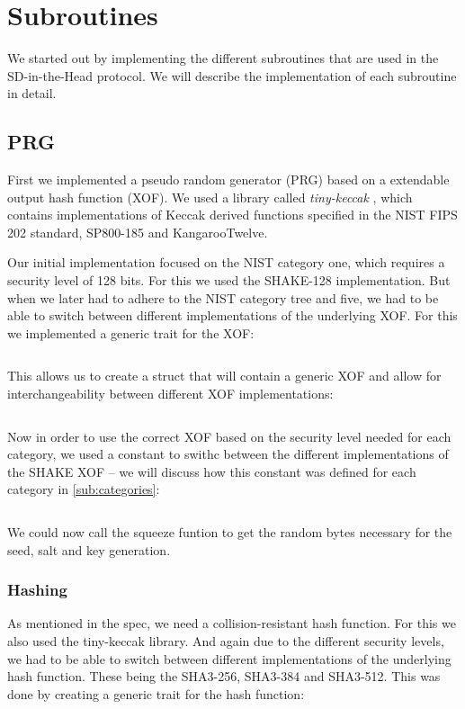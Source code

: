 \documentclass[twoside,11pt]{report}
\theoremstyle{definition}
\theoremstyle{plain}
\begin{document}
\section{Subroutines}\label{sub:subroutines}
We started out by implementing the different subroutines that are used in the SD-in-the-Head protocol. We will describe the implementation of each subroutine in detail.

\subsection{PRG}
First we implemented a pseudo random generator (PRG) based on a extendable output hash function (XOF). We used a library called \textit{tiny-keccak} \cite{tiny-keccak}, which contains implementations of Keccak derived functions specified in the NIST FIPS 202 standard, SP800-185 and KangarooTwelve.

Our initial implementation focused on the NIST category one, which requires a security level of 128 bits. For this we used the SHAKE-128 implementation. But when we later had to adhere to the NIST category tree and five, we had to be able to switch between different implementations of the underlying XOF. For this we implemented a generic trait for the XOF:
\inputminted[firstline=18, lastline=23]{rust}{../sdith/src/subroutines/prg/xof.rs}
This allows us to create a struct that will contain a generic XOF and allow for interchangeability between different XOF implementations:
\inputminted[firstline=25, lastline=27]{rust}{../sdith/src/subroutines/prg/xof.rs}
Now in order to use the correct XOF based on the security level needed for each category, we used a constant to swithc between the different implementations of the SHAKE XOF -- we will discuss how this constant was defined for each category in \autoref{sub:categories}:
\inputminted[firstline=37, lastline=43]{rust}{../sdith/src/subroutines/prg/xof.rs}
We could now call the squeeze funtion to get the random bytes necessary for the seed, salt and key generation.

\subsubsection{Hashing}\label{sec:hashing} %
As mentioned in the spec, we need a collision-resistant hash function. For this we also used the tiny-keccak library. And again due to the different security levels, we had to be able to switch between different implementations of the underlying hash function. These being the SHA3-256, SHA3-384 and SHA3-512.
This was done by creating a generic trait for the hash function:
\inputminted[firstline=11, lastline=17]{rust}{../sdith/src/subroutines/prg/hashing.rs}
\end{document}
